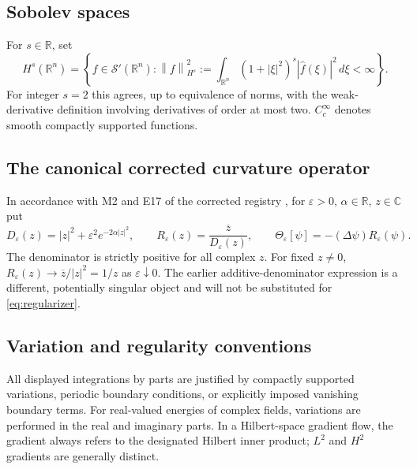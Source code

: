 \documentclass[11pt,letterpaper]{article}
\theoremstyle{definition}
\theoremstyle{remark}
\newcommand{\R}{\mathbb R}
\newcommand{\C}{\mathbb C}
\newcommand{\norm}[1]{\left\lVert#1\right\rVert}
\newcommand{\abs}[1]{\left\lvert#1\right\rvert}
\begin{document}
\subsection{Sobolev spaces}
For $s\in\R$, set
\begin{equation}\label{eq:Hs}
H^s(\R^n)=\left\{f\in\mathscr S'(\R^n):
\norm f_{H^s}^2:=\int_{\R^n}(1+\abs\xi^2)^s
\abs{\widehat f(\xi)}^2\,d\xi<\infty\right\}.
\end{equation}
For integer $s=2$ this agrees, up to equivalence of norms, with the
weak-derivative definition involving derivatives of order at most two.
$C_c^\infty$ denotes smooth compactly supported functions.

\subsection{The canonical corrected curvature operator}
In accordance with M2 and E17 of the corrected registry \cite{registry},
for $\varepsilon>0$, $\alpha\in\R$, $z\in\C$ put
\begin{equation}\label{eq:regularizer}
D_\varepsilon(z)=\abs z^2+\varepsilon^2e^{-2\alpha\abs z^2},\qquad
R_\varepsilon(z)=\frac{\overline z}{D_\varepsilon(z)},\qquad
\Theta_\varepsilon[\psi]=-(\Delta\psi)R_\varepsilon(\psi).
\end{equation}
The denominator is strictly positive for all complex $z$. For fixed $z\ne0$,
$R_\varepsilon(z)\to\overline z/\abs z^2=1/z$ as $\varepsilon\downarrow0$.
The earlier additive-denominator expression is a different, potentially
singular object and will not be substituted for \eqref{eq:regularizer}.

\subsection{Variation and regularity conventions}
All displayed integrations by parts are justified by compactly supported
variations, periodic boundary conditions, or explicitly imposed vanishing
boundary terms. For real-valued energies of complex fields, variations are
performed in the real and imaginary parts. In a Hilbert-space gradient
flow, the gradient always refers to the designated Hilbert inner product;
$L^2$ and $H^2$ gradients are generally distinct.
\end{document}
